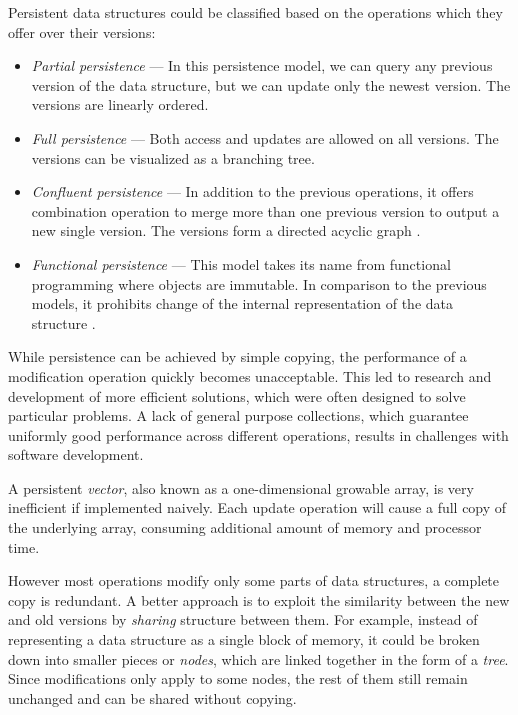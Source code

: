 Persistent data structures could be classified based on the operations which they offer over their versions:
\begin{itemize}
    \item \textit{Partial persistence} --- In this persistence model, we can query any previous version of the data structure, but we can update only the newest version. The versions are linearly ordered. 
    \item \textit{Full persistence} --- Both access and updates are allowed on all versions. The versions can be visualized as a branching tree.
    \item \textit{Confluent persistence} --- In addition to the previous operations, it offers combination operation to merge more than one previous version to output a new single version. The versions form a directed acyclic graph \cite{fully-persistent-lists-with-catenation}.  
    \item \textit{Functional persistence} --- This model takes its name from functional programming where objects are immutable. In comparison to the previous models, it prohibits change of the internal representation of the data structure \cite{purely-functional-data-structures}. 
\end{itemize}

While persistence can be achieved by simple copying, the performance of a modification operation quickly becomes unacceptable. This led to research and development of more efficient solutions, which were often designed to solve particular problems. A lack of general purpose collections, which guarantee uniformly good performance across different operations, results in challenges with software development. 

A persistent \emph{vector}, also known as a one-dimensional growable array, is very inefficient if implemented naively. Each update operation will cause a full copy of the underlying array, consuming additional amount of memory and processor time. 

However most operations modify only some parts of data structures, a complete copy is redundant. A better approach is to exploit the similarity between the new and old versions by \emph{sharing} structure between them. For example, instead of representing a data structure as a single block of memory, it could be broken down into smaller pieces or \emph{nodes}, which are linked together in the form of a \emph{tree}. Since modifications only apply to some nodes, the rest of them still remain unchanged and can be shared without copying. 

